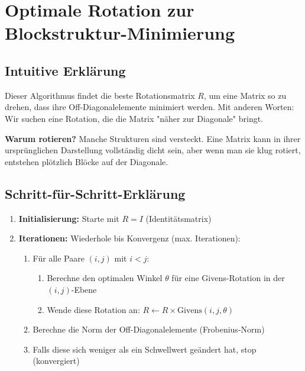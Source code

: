 \documentclass[a4paper,12pt]{article}
\begin{document}
\section{Optimale Rotation zur Blockstruktur-Minimierung}

\subsection{Intuitive Erklärung}

Dieser Algorithmus findet die beste Rotationsmatrix $R$, um eine Matrix so zu drehen, dass ihre Off-Diagonalelemente minimiert werden. Mit anderen Worten: Wir suchen eine Rotation, die die Matrix "näher zur Diagonale" bringt.

\textbf{Warum rotieren?} Manche Strukturen sind versteckt. Eine Matrix kann in ihrer ursprünglichen Darstellung vollständig dicht sein, aber wenn man sie klug rotiert, entstehen plötzlich Blöcke auf der Diagonale.

\subsection{Schritt-für-Schritt-Erklärung}

\begin{enumerate}
\item \textbf{Initialisierung:} Starte mit $R = I$ (Identitätsmatrix)

\item \textbf{Iterationen:} Wiederhole bis Konvergenz (max. Iterationen):

\begin{enumerate}
\item Für alle Paare $(i, j)$ mit $i < j$:

\begin{enumerate}
\item Berechne den optimalen Winkel $\theta$ für eine Givens-Rotation in der $(i, j)$-Ebene

\item Wende diese Rotation an: $R \leftarrow R \times \text{Givens}(i, j, \theta)$
\end{enumerate}

\item Berechne die Norm der Off-Diagonalelemente (Frobenius-Norm)

\item Falls diese sich weniger als ein Schwellwert geändert hat, stop (konvergiert)
\end{enumerate}
\end{enumerate}
\end{document}
